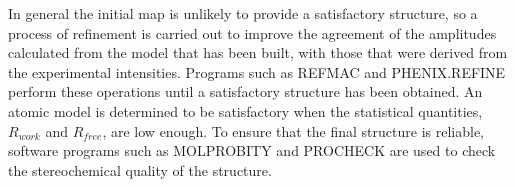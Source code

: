         In general the initial map is unlikely to provide a satisfactory structure, so a process of refinement is carried out to improve the agreement of the amplitudes calculated from the model that has been built, with those that were derived from the experimental intensities.
        Programs such as REFMAC \cite{murshudov2011refmac5} and PHENIX.REFINE \cite{adams2010phenix} perform these operations until a satisfactory structure has been obtained.
        An atomic model is determined to be satisfactory when the statistical quantities, $R_{work}$ and $R_{free}$, are low enough.
        To ensure that the final structure is reliable, software programs such as MOLPROBITY \cite{chen2010molprobity} and PROCHECK \cite{laskowski1993procheck} are used to check the stereochemical quality of the structure.
